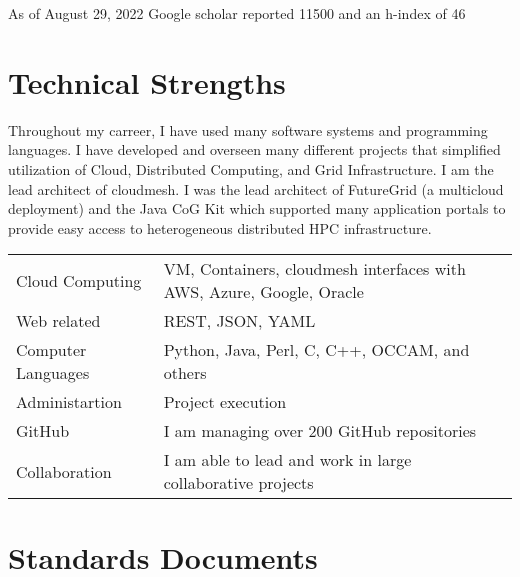 \documentclass{article}
\begin{document}
As of August 29, 2022 Google scholar reported 11500 and an h-index of 46



\section{Technical Strengths}

Throughout my carreer, I have used many software systems and
programming languages.  I have developed and overseen many different
projects that simplified utilization of Cloud, Distributed Computing,
and Grid Infrastructure. I am the lead architect of cloudmesh. I was
the lead architect of FutureGrid (a multicloud deployment) and the
Java CoG Kit which supported many application portals to provide easy
access to heterogeneous distributed HPC infrastructure.

\bigskip

\begin{tabular}{ll}
Cloud Computing & VM, Containers, cloudmesh interfaces with AWS, Azure, Google, Oracle\\
Web related & REST, JSON, YAML \\
Computer Languages & Python, Java, Perl, C, C++, OCCAM, and others\\
Administartion & Project execution\\
GitHub         & I am managing over 200 GitHub repositories\\
Collaboration & I am able to lead and work in large collaborative projects\\
\end{tabular}


\section{Standards Documents}

\begin{refsegment}

  \nocite{las-2020-nist-bigdata}
  \nocite{las-2019-nist}  
  \nocite{las-2019-nist-vol8}
  \nocite{las-2001-gosv3}
  \nocite{las-2001-gosv2}  

\end{refsegment}
\end{document}
